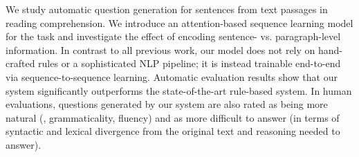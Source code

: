 We study automatic question generation for sentences from text passages in reading comprehension. We introduce an attention-based sequence learning model for the task and investigate the effect of encoding sentence- vs. paragraph-level information. In contrast to all previous work, our model does not rely on hand-crafted rules or a sophisticated NLP pipeline;  it is instead trainable end-to-end via sequence-to-sequence learning. Automatic evaluation results show that our system significantly outperforms the state-of-the-art rule-based system. In human evaluations, questions generated by our system are also rated as being more natural (\ie, grammaticality, fluency) and as more difficult to answer (in terms of syntactic and lexical divergence from the original text and reasoning needed to answer).
